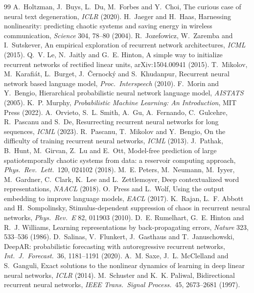 \documentclass[11pt]{article}
\begin{document}
\begin{thebibliography}{99}
 A.~Holtzman, J.~Buys, L.~Du, M.~Forbes and Y.~Choi, The curious case of neural text degeneration, \emph{ICLR} (2020).
 H.~Jaeger and H.~Haas, Harnessing nonlinearity: predicting chaotic systems and saving energy in wireless communication, \emph{Science} 304, 78--80 (2004).
 R.~Jozefowicz, W.~Zaremba and I.~Sutskever, An empirical exploration of recurrent network architectures, \emph{ICML} (2015).
 Q.~V. Le, N.~Jaitly and G.~E. Hinton, A simple way to initialize recurrent networks of rectified linear units, arXiv:1504.00941 (2015).
 T.~Mikolov, M.~Karafi\'at, L.~Burget, J.~\v{C}ernock\'y and S.~Khudanpur, Recurrent neural network based language model, \emph{Proc.\ Interspeech} (2010).
 F.~Morin and Y.~Bengio, Hierarchical probabilistic neural network language model, \emph{AISTATS} (2005).
 K.~P. Murphy, \emph{Probabilistic Machine Learning: An Introduction}, MIT Press (2022).
 A.~Orvieto, S.~L. Smith, A.~Gu, A.~Fernando, C.~Gulcehre, R.~Pascanu and S.~De, Resurrecting recurrent neural networks for long sequences, \emph{ICML} (2023).
 R.~Pascanu, T.~Mikolov and Y.~Bengio, On the difficulty of training recurrent neural networks, \emph{ICML} (2013).
 J.~Pathak, B.~Hunt, M.~Girvan, Z.~Lu and E.~Ott, Model-free prediction of large spatiotemporally chaotic systems from data: a reservoir computing approach, \emph{Phys.\ Rev.\ Lett.}\ 120, 024102 (2018).
 M.~E. Peters, M.~Neumann, M.~Iyyer, M.~Gardner, C.~Clark, K.~Lee and L.~Zettlemoyer, Deep contextualized word representations, \emph{NAACL} (2018).
 O.~Press and L.~Wolf, Using the output embedding to improve language models, \emph{EACL} (2017).
 K.~Rajan, L.~F. Abbott and H.~Sompolinsky, Stimulus-dependent suppression of chaos in recurrent neural networks, \emph{Phys.\ Rev.\ E} 82, 011903 (2010).
 D.~E. Rumelhart, G.~E. Hinton and R.~J. Williams, Learning representations by back-propagating errors, \emph{Nature} 323, 533--536 (1986).
 D.~Salinas, V.~Flunkert, J.~Gasthaus and T.~Januschowski, DeepAR: probabilistic forecasting with autoregressive recurrent networks, \emph{Int.\ J.\ Forecast.}\ 36, 1181--1191 (2020).
 A.~M. Saxe, J.~L. McClelland and S.~Ganguli, Exact solutions to the nonlinear dynamics of learning in deep linear neural networks, \emph{ICLR} (2014).
 M.~Schuster and K.~K. Paliwal, Bidirectional recurrent neural networks, \emph{IEEE Trans.\ Signal Process.}\ 45, 2673--2681 (1997).

\end{thebibliography}
\end{document}
